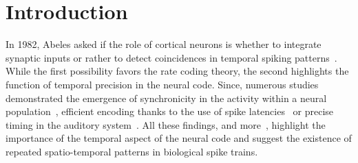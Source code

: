 \documentclass[default]{sn-jnl}%
\theoremstyle{thmstyleone}%
\theoremstyle{thmstyletwo}%
\theoremstyle{thmstylethree}%
\begin{document}
\title{\Title}
%

\author*{ }

\author{ }


%
%
%
%


\abstract{
\Abstract
}


%
%
%
\keywords{\Keywords}
%
\maketitle
\section{Introduction}
\label{sec:intro}
%
In 1982, Abeles asked if the role of cortical neurons is whether to integrate synaptic inputs or rather to detect coincidences in temporal spiking patterns~\cite{abeles1982role}. While the first possibility favors the rate coding theory, the second highlights the function of temporal precision in the neural code. Since, numerous studies demonstrated the emergence of synchronicity in the activity within a neural population~\cite{riehle1997spike, davis2021spontaneous}, efficient encoding thanks to the use of spike latencies~\cite{perrinet2004coding, gollisch2008rapid} or precise timing in the auditory system~\cite{deweese2002binary, carr1990circuit}. All these findings, and more~\cite{bohte2004evidence}, highlight the importance of the temporal aspect of the neural code and suggest the existence of repeated spatio-temporal patterns in biological spike trains.
\end{document}
